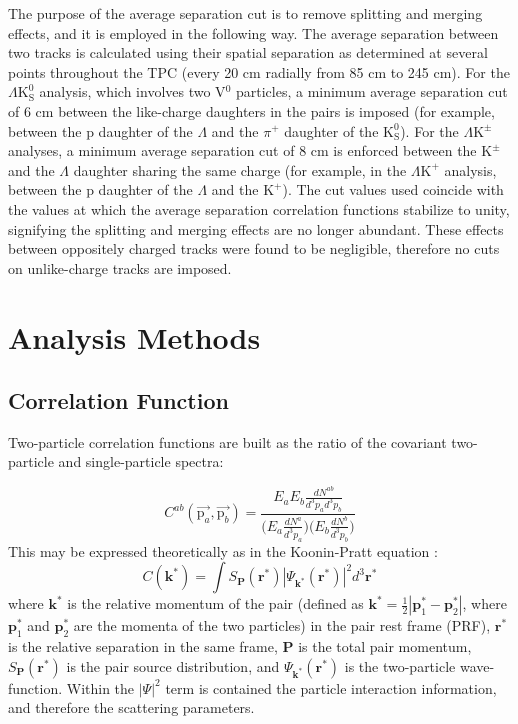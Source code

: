 \documentclass[ALICE,manyauthors]{cernphprep}
\newcommand{\Lam}{$\Lambda$\xspace}
\newcommand{\KchP}{$\mathrm{K^{+}}$\xspace}
\newcommand{\Kpm}{$\mathrm{K^{\pm}}$\xspace}
\newcommand{\Ks}{$\mathrm{K^{0}_{S}}$\xspace}
\newcommand{\LamKchP}{$\Lambda\mathrm{K^{+}}$\xspace}
\newcommand{\LamKpm}{$\Lambda\mathrm{K^{\pm}}$\xspace}
\newcommand{\LamKs}{$\Lambda\mathrm{K^{0}_{S}}$\xspace}
\newcommand{\Vz}{V$^{0}$\xspace}
\begin{document}
The purpose of the average separation cut is to remove splitting and merging effects, and it is employed in the following way.  
The average separation between two tracks is calculated using their spatial separation as determined at several points throughout the TPC (every 20 cm radially from 85 cm to 245 cm).
For the \LamKs analysis, which involves two \Vz particles, a minimum average separation cut of 6 cm between the like-charge daughters in the pairs is imposed (for example, between the p daughter of the \Lam and the $\pi^{+}$ daughter of the \Ks).
For the \LamKpm analyses, a minimum average separation cut of 8 cm is enforced between the \Kpm and the \Lam daughter sharing the same charge (for example, in the \LamKchP analysis, between the p daughter of the \Lam and the \KchP).
The cut values used coincide with the values at which the average separation correlation functions stabilize to unity, signifying the splitting and merging effects are no longer abundant.
These effects between oppositely charged tracks were found to be negligible, therefore no cuts on unlike-charge tracks are imposed.


\section{Analysis Methods}
\label{sec:AnalysisMethods}

\subsection{Correlation Function}
\label{sec:CorrelationFunction}
Two-particle correlation functions are built as the ratio of the covariant two-particle and single-particle spectra:

\begin{equation}
  C^{ab}(\vec{\mathrm{p}_{a}},\vec{\mathrm{p}_{b}}) = \frac{E_{a}E_{b}\frac{dN^{ab}}{d^{3}p_{a}d^{3}p_{b}}}{\big( E_{a}\frac{dN^{a}}{d^{3}p_{a}} \big) \big( E_{b}\frac{dN^{b}}{d^{3}p_{b}} \big)}
\label{eqn:CfRatioSpectra}
\end{equation}
This may be expressed theoretically as in the Koonin-Pratt equation \cite{Koonin:1977fh, Pratt:1990zq}:
\begin{equation}
 C(\mathbf{k^{*}}) = \int S_{\mathbf{P}}(\mathbf{r^{*}})|\Psi_{\mathbf{k^{*}}}(\mathbf{r^{*}})|^{2}d^{3}\mathbf{r^{*}}
\label{eqn:KooninPrattEqn}
\end{equation}
where $\mathbf{k}^{*}$ is the relative momentum of the pair (defined as $\mathbf{k}^{*} = \frac{1}{2}|\mathbf{p}_{1}^{*}-\mathbf{p}_{2}^{*}|$, where $\mathbf{p}_{1}^{*}$ and $\mathbf{p}_{2}^{*}$ are the momenta of the two particles) in the pair rest frame (PRF), $\mathbf{r}^{*}$ is the relative separation in the same frame, $\mathbf{P}$ is the total pair momentum, $S_{\mathbf{P}}(\mathbf{r^{*}})$ is the pair source distribution, and $\Psi_{\mathbf{k^{*}}}(\mathbf{r^{*}})$ is the two-particle wave-function.
Within the $|\Psi|^{2}$ term is contained the particle interaction information, and therefore the scattering parameters.
\end{document}
